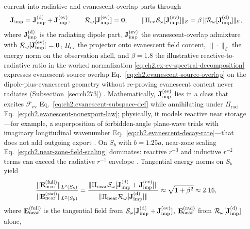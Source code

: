 current into radiative and evanescent-overlap parts through
\begin{equation}
\label{eq:ch2.ex-ev-spectral-decomposition}
\mathbf{J}_{\mathrm{imp}}
=
\mathbf{J}_{\mathrm{imp}}^{(\mathrm{d})}+\mathbf{J}_{\mathrm{imp}}^{(\mathrm{ev})},
\qquad
\mathcal{R}_\omega[\mathbf{J}_{\mathrm{imp}}^{(\mathrm{ev})}]=\mathbf{0},
\qquad
\|\Pi_{\mathrm{ev}}\mathcal{S}_\omega[\mathbf{J}_{\mathrm{imp}}^{(\mathrm{ev})}]\|_{\mathcal{E}}
=
\beta\,\|\mathcal{R}_\omega[\mathbf{J}_{\mathrm{imp}}^{(\mathrm{d})}]\|_{\mathcal{E}},
\end{equation}
where $\mathbf{J}_{\mathrm{imp}}^{(\mathrm{d})}$ is the radiating dipole part, $\mathbf{J}_{\mathrm{imp}}^{(\mathrm{ev})}$ the
evanescent-overlap admixture with $\mathcal{R}_\omega[\mathbf{J}_{\mathrm{imp}}^{(\mathrm{ev})}]=\mathbf{0}$,
$\Pi_{\mathrm{ev}}$ the projector onto evanescent field content,
$\|\cdot\|_{\mathcal{E}}$ the energy norm on the observation shell, and
$\beta=1.8$ the illustrative reactive-to-radiative ratio in the worked normalization
\eqref{eq:ch2.ex-ev-spectral-decomposition} expresses evanescent source overlap
Eq.~\eqref{eq:ch2.evanescent-source-overlap} on the dipole-plus-evanescent geometry without
re-proving evanescent content never radiates (Subsection~\ref{sec:ch273})
\cite{stratton1941}. Mathematically, \(\mathbf{J}_{\mathrm{imp}}^{(\mathrm{ev})}\) lies in a class that excites
\(\mathcal{F}_{\mathrm{ev}}\) Eq.~\eqref{eq:ch2.evanescent-subspace-def} while annihilating under
\(\Pi_{\mathrm{rad}}\) Eq.~\eqref{eq:ch2.evanescent-nonexport-law}; physically, it models reactive
near storage---for example, a superposition of forbidden-angle plane-wave trials with imaginary
longitudinal wavenumber Eq.~\eqref{eq:ch2.evanescent-decay-rate}---that does not add outgoing
export \cite{harrington2001}.
On \(S_b\) with \(b=1.25a\), near-zone scaling Eq.~\eqref{eq:ch2.near-zone-field-scaling}
dominates: reactive \(r^{-3}\) and inductive \(r^{-2}\) terms can exceed the radiative \(r^{-1}\)
envelope \cite{stratton1941}. Tangential energy norms on \(S_b\) yield
\begin{equation}
\label{eq:ch2.ex-ev-near-amplitude-ratio}
\frac{\|\mathbf{E}_{\mathrm{near}}^{(\mathrm{full})}\|_{L^{2}(S_b)}}
 {\|\mathbf{E}_{\mathrm{near}}^{(\mathrm{rad})}\|_{L^{2}(S_b)}}
=
\frac{\|\Pi_{\mathrm{near}}\mathcal{S}_\omega[\mathbf{J}_{\mathrm{imp}}^{(\mathrm{d})}+\mathbf{J}_{\mathrm{imp}}^{(\mathrm{ev})}]\|}
 {\|\Pi_{\mathrm{near}}\mathcal{R}_\omega[\mathbf{J}_{\mathrm{imp}}^{(\mathrm{d})}]\|}
\approx
\sqrt{1+\beta^{2}}
\approx
2.16,
\end{equation}
where $\mathbf{E}_{\mathrm{near}}^{(\mathrm{full})}$ is the tangential field from
$\mathcal{S}_\omega[\mathbf{J}_{\mathrm{imp}}^{(\mathrm{d})}+\mathbf{J}_{\mathrm{imp}}^{(\mathrm{ev})}]$,
$\mathbf{E}_{\mathrm{near}}^{(\mathrm{rad})}$ from $\mathcal{R}_\omega[\mathbf{J}_{\mathrm{imp}}^{(\mathrm{d})}]$ alone,
